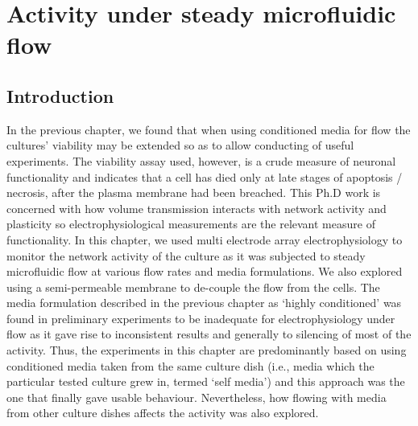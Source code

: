 \chapter{Activity under steady microfluidic flow}
\label{chap:activityAndFlow}

\section{Introduction}
In the previous chapter, we found that when using conditioned media for flow the cultures' viability may be extended so as to allow conducting of useful experiments. The viability assay used, however, is a crude measure of neuronal functionality and indicates that a cell has died only at late stages of apoptosis / necrosis, after the plasma membrane had been breached. This Ph.D work is concerned with how volume transmission interacts with network activity and plasticity so electrophysiological measurements are the relevant measure of functionality. In this chapter, we used multi electrode array electrophysiology to monitor the network activity of the culture as it was subjected to steady microfluidic flow at various flow rates and media formulations. We also explored using a semi-permeable membrane to de-couple the flow from the cells. The media formulation described in the previous chapter as `highly conditioned' was found in preliminary experiments to be inadequate for electrophysiology under flow as it gave rise to inconsistent results and generally to silencing of most of the activity. Thus, the experiments in this chapter are predominantly based on using conditioned media taken from the same culture dish (i.e., media which the particular tested culture grew in, termed `self media') and this approach was the one that finally gave usable behaviour. Nevertheless, how flowing with media from other culture dishes affects the activity was also explored.

